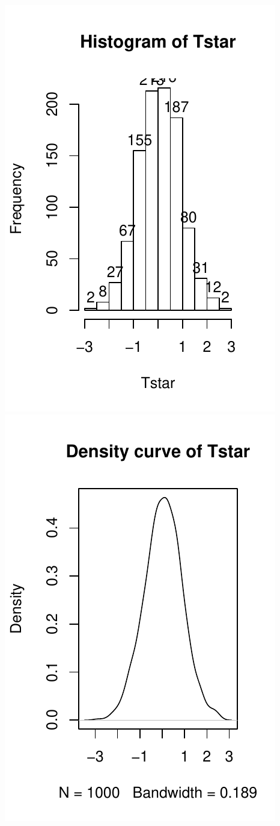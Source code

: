\documentclass[]{book}
\begin{document}
\includegraphics{GreenwoodBanner_files/figure-latex/Figure2-9-1.pdf}
\includegraphics{GreenwoodBanner_files/figure-latex/Figure2-9-2.pdf}
\end{document}
